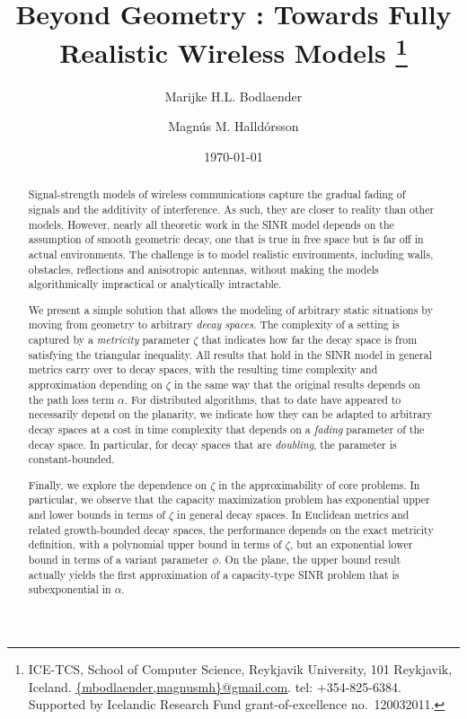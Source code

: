 \documentclass[11pt]{amsart}
\title{Beyond Geometry : Towards Fully Realistic Wireless Models
\thanks{ICE-TCS, School of Computer Science, Reykjavik University, 101 Reykjavik, Iceland. \url{
\{mbodlaender,magnusmh\}@gmail.com}. tel: +354-825-6384.
Supported by Icelandic Research Fund grant-of-excellence no.~120032011.}}
\author{Marijke H.L. Bodlaender \and Magn\'us M. Halld\'orsson}
\begin{document}
\begin{titlepage}

\date{\today}
\thispagestyle{empty}

\begin{abstract}
Signal-strength models of wireless communications capture the gradual
fading of signals and the additivity of interference. As such, they
are closer to reality than other models. However, nearly all theoretic
work in the SINR model depends on the assumption of smooth geometric
decay, one that is true in free space but is far off in actual
environments. The challenge is to model realistic environments,
including walls, obstacles, reflections and anisotropic antennas,
without making the models algorithmically impractical or analytically
intractable.

We present a simple solution that allows the modeling of arbitrary
static situations by moving from geometry to arbitrary \emph{decay
  spaces}.  The complexity of a setting is captured by a
\emph{metricity} parameter $\zeta$ that indicates how far the decay
space is from satisfying the triangular inequality.  All results that
hold in the SINR model in general metrics carry over to decay spaces,
with the resulting time complexity and approximation depending on
$\zeta$ in the same way that the original results depends on the path
loss term $\alpha$.  For distributed algorithms, that to date have
appeared to necessarily depend on the planarity, we indicate how they
can be adapted to arbitrary decay spaces at a cost in time complexity
that depends on a \emph{fading} parameter of the decay space. In
particular, for decay spaces that are \emph{doubling}, the parameter
is constant-bounded.

Finally, we explore the dependence on $\zeta$ in the approximability
of core problems. In particular, we observe that the capacity maximization problem 
has exponential upper and lower bounds in terms of $\zeta$ in general
decay spaces. In Euclidean metrics and related growth-bounded decay
spaces, the performance depends on the exact metricity definition, 
with a polynomial upper bound in terms of $\zeta$, but an exponential
lower bound in terms of a variant parameter $\phi$.
On the plane, the upper bound result actually yields the first approximation of 
a capacity-type SINR problem that is subexponential in $\alpha$.
\end{abstract}

\maketitle

\vspace{4em}



\end{titlepage}
\end{document}
